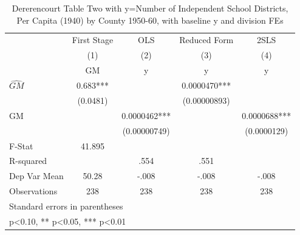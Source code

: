 \begin{table}[htbp]\centering
\def\sym#1{\ifmmode^{#1}\else\(^{#1}\)\fi}
\caption{Dererencourt Table Two with y=Number of Independent School Districts, Per Capita (1940) by County 1950-60, with baseline y and division FEs}
\begin{tabular}{l*{4}{c}}
\toprule
                    & First Stage   &         OLS   &Reduced Form   &        2SLS   \\
                    &\multicolumn{1}{c}{(1)}&\multicolumn{1}{c}{(2)}&\multicolumn{1}{c}{(3)}&\multicolumn{1}{c}{(4)}\\
                    &\multicolumn{1}{c}{GM}&\multicolumn{1}{c}{y}&\multicolumn{1}{c}{y}&\multicolumn{1}{c}{y}\\
\midrule
$\hat{GM}$          &       0.683***&               &   0.0000470***&               \\
                    &    (0.0481)   &               &(0.00000893)   &               \\
\addlinespace
GM                  &               &   0.0000462***&               &   0.0000688***\\
                    &               &(0.00000749)   &               & (0.0000129)   \\
\midrule
F-Stat              &      41.895   &               &               &               \\
R-squared           &               &        .554   &        .551   &               \\
Dep Var Mean        &       50.28   &       -.008   &       -.008   &       -.008   \\
Observations        &         238   &         238   &         238   &         238   \\
\bottomrule
\multicolumn{5}{l}{\footnotesize Standard errors in parentheses}\\
\multicolumn{5}{l}{\footnotesize * p<0.10, ** p<0.05, *** p<0.01}\\
\end{tabular}
\end{table}
